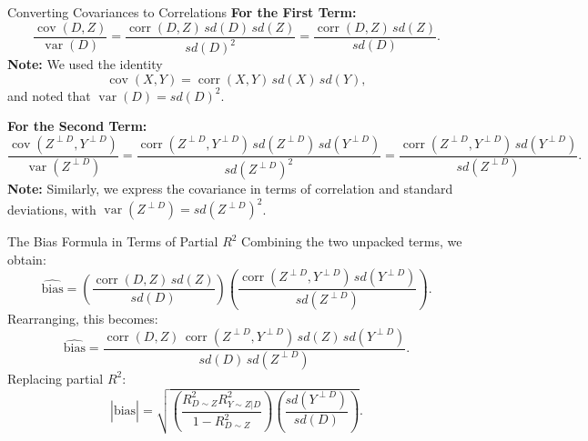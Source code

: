 \documentclass[aspectratio=169, handout, t]{beamer}
\numberwithin{equation}{section}
\begin{document}
\begin{frame}{Converting Covariances to Correlations}
\vspace{-1ex}
\textbf{For the First Term:}
\[
\frac{\operatorname{cov}(D,Z)}{\operatorname{var}(D)} 
=\frac{\operatorname{corr}(D,Z)\,sd(D)\,sd(Z)}{sd(D)^2}
=\frac{\operatorname{corr}(D,Z)\,sd(Z)}{sd(D)}.
\]
\textbf{Note:}  
We used the identity
\[
\operatorname{cov}(X,Y)=\operatorname{corr}(X,Y)\,sd(X)\,sd(Y),
\]
and noted that \(\operatorname{var}(D)=sd(D)^2\).

\vspace{2ex}\pause
\textbf{For the Second Term:}
\[
\frac{\operatorname{cov}(Z^{\perp D},Y^{\perp D})}{\operatorname{var}(Z^{\perp D})}
=\frac{\operatorname{corr}(Z^{\perp D},Y^{\perp D})\,sd(Z^{\perp D})\,sd(Y^{\perp D})}{sd(Z^{\perp D})^2}
=\frac{\operatorname{corr}(Z^{\perp D},Y^{\perp D})\,sd(Y^{\perp D})}{sd(Z^{\perp D})}.
\]
\textbf{Note:}  
Similarly, we express the covariance in terms of correlation and standard deviations, with \(\operatorname{var}(Z^{\perp D})=sd(Z^{\perp D})^2\).
\end{frame}

\begin{frame}{The Bias Formula in Terms of Partial $R^2$}
Combining the two unpacked terms, we obtain:
\[
\widehat{\text{bias}} 
=\left(\frac{\operatorname{corr}(D,Z)\,sd(Z)}{sd(D)}\right)
\left(\frac{\operatorname{corr}(Z^{\perp D},Y^{\perp D})\,sd(Y^{\perp D})}{sd(Z^{\perp D})}\right).
\]
Rearranging, this becomes:
\[
\widehat{\text{bias}} = \frac{\operatorname{corr}(D,Z)\,\operatorname{corr}(Z^{\perp D},Y^{\perp D})\,sd(Z)\,sd(Y^{\perp D})}{sd(D)\,sd(Z^{\perp D})}.
\]
Replacing partial $R^2$:
\[
|\widehat{\text{bias}}| = \sqrt{\left(\frac{R^2_{D\sim Z}R^2_{Y\sim Z|D}}{1 - R^2_{D\sim Z}}\right)
\left(\frac{sd(Y^{\perp D})}{sd(D)}\right)}.
\]
\end{frame}
\end{document}
